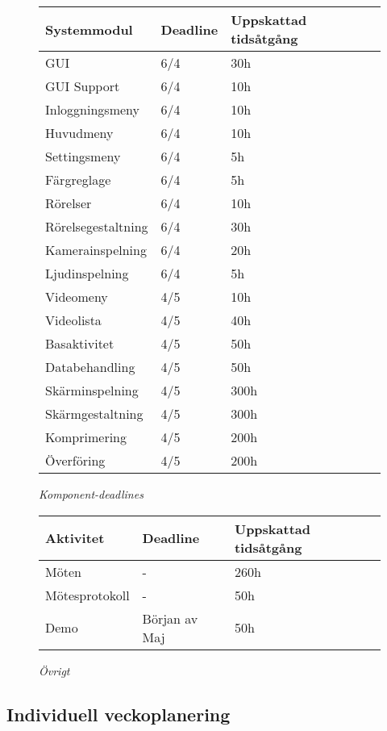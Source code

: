 \begin{figure}[H]
\centering
\begin{tabular}{ | l | l | l |}
  \hline
  \textbf{Systemmodul} & \textbf{Deadline} & \textbf{Uppskattad tidsåtgång} \\ \hline
  GUI & 6/4 & 30h \\ \hline
  GUI Support & 6/4 & 10h \\ \hline
  Inloggningsmeny & 6/4 & 10h \\ \hline
  Huvudmeny & 6/4 & 10h \\ \hline
  Settingsmeny & 6/4 & 5h \\ \hline
  Färgreglage & 6/4 & 5h \\ \hline
  Rörelser & 6/4 & 10h \\ \hline
  Rörelsegestaltning & 6/4 & 30h \\ \hline
  Kamerainspelning & 6/4 & 20h \\ \hline
  Ljudinspelning & 6/4 & 5h \\ \hline
  Videomeny & 4/5 & 10h \\ \hline
  Videolista & 4/5 & 40h \\ \hline
  Basaktivitet & 4/5 & 50h \\ \hline
  Databehandling & 4/5 & 50h \\ \hline
  Skärminspelning & 4/5 & 300h  \\ \hline
  Skärmgestaltning & 4/5 & 300h \\ \hline
  Komprimering & 4/5 & 200h \\ \hline
  Överföring & 4/5 & 200h \\ \hline
\end{tabular}
\caption*{\textit{Komponent-deadlines}}
\end{figure}

\begin{figure}[H]
\centering
\begin{tabular}{ | l | l | l | }
  \hline
  \textbf{Aktivitet} & \textbf{Deadline} & \textbf{Uppskattad tidsåtgång} \\ \hline
  Möten & - & 260h \\ \hline
  Mötesprotokoll & - & 50h \\ \hline
  Demo & Början av Maj & 50h \\ \hline
\end{tabular}
\caption*{\textit{Övrigt}}
\end{figure}

\subsection{Individuell veckoplanering}

